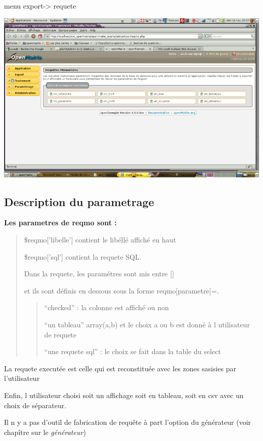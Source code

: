 \documentclass[letterpaper,10pt,french]{manual}
\begin{document}
menu export-\textgreater{} requete

\includegraphics{reqmo_1.png}


\subsection{Description du parametrage}

\textbf{Les parametres de reqmo  sont :}
\begin{quote}

\$reqmo{[}'libelle'{]} contient le libéllé affiché en haut

\$reqmo{[}'sql'{]} contient la requete SQL.

Dans la requete, les paramétres sont mis entre {[}{]}

et ils sont définis en dessous  sous la forme reqmo{[}parametre{]}=.
\begin{quote}

``checked'' : la colonne est affiché ou non

``un tableau'' array(a,b) et le choix a ou b est donné à l utilisateur de requete

``une requete sql'' : le choix se fait dans la table du select
\end{quote}
\end{quote}

La requete executée est celle qui est reconstituée avec les zones sasisies par l'utilisateur

Enfin, l utilisateur choisi soit un affichage soit en tableau, soit en csv avec un choix de séparateur.

Il n y a pas d'outil de fabrication de requête à part l'option du générateur
(voir chapître sur le \emph{générateur})
\end{document}
